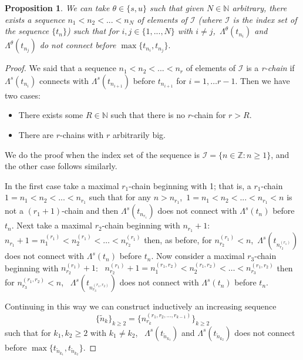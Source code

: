 \documentclass[12pt]{amsart}
\theoremstyle{plain} %
\newtheorem{proposition}[theorem]{Proposition}
\theoremstyle{definition} %
\numberwithin{equation}{section}
\begin{document}
  \begin{proposition}\label{cadeias}
  We can take $\theta \in \{s,u\}$ such that given $N\in \mathbb{N}$ arbitrary, there exists a sequence $n_1<n_2<...<n_N$ of elements of $\mathcal{I}$ (where $\mathcal{I}$ is the index set of the sequence $\{ t_n\}$) such that for $i,j\in  \{1,...,N \}$ with $i\neq j$,\ $\Lambda^{\theta}(t_{n_i})$ and $\Lambda^{\theta}(t_{n_j})$ do not connect before $\max \{ t_{n_i}, t_{n_j} \}.$
  \end{proposition}
 
 \begin{proof}
 
 We said that a sequence $n_1< n_2 <... <n_r$ of elements of $\mathcal{I}$ is a \emph{r-chain} if  $\Lambda^s(t_{n_i})$ connects with $\Lambda^s(t_{n_{i+1}})$ before $t_{n_{i+1}}$ for $i=1,\dots r-1$. Then we have two cases:
 \begin{itemize}
    \item There exists some $R\in \mathbb{N}$ such that there is no $r$-chain for $r>R$.
    \item There are $r$-chains with $r$ arbitrarily big.
    \end{itemize}

 We do the proof when the index set of the sequence is $\mathcal{I}=\{n\in \mathbb{Z}:n\geq 1\}$, and the other case follows similarly.  
 
 In the first case take a maximal $r_1$-chain beginning with 1; that is, a $r_1$-chain  $1=n_1<n_2<...<n_{r_1}$ such that for any $n>n_{r_1}$,\ $1=n_1<n_2<...<n_{r_1}<n$ is not a $(r_1+1)$-chain and then $\Lambda^s(t_{n_{r_1}})$ does not connect with $\Lambda^s(t_{n})$ before $t_n$.
 Next take a maximal $r_2$-chain beginning with $n_{r_1}+1$:\ $n_{r_1}+1=n^{(r_1)}_1<n^{(r_1)}_2<\dots < n^{(r_1)}_{r_2}$ then, as before, for $n^{(r_1)}_{r_2}< n$,\ $\Lambda^s(t_{n^{(r_1)}_{r_2}})$ does not connect with $\Lambda^s(t_{n})$ before $t_n$. Now 
 consider a maximal $r_3$-chain beginning with $n^{(r_1)}_{r_2}+1$: \ $n^{(r_1)}_{r_2}+1=n^{(r_1,r_2)}_1<n^{(r_1,r_2)}_2<\dots < n^{(r_1,r_2)}_{r_3}$ then for $n^{(r_1,r_2)}_{r_3}< n$, \ $\Lambda^s(t_{n^{(r_1,r_2)}_{r_3}})$ does not connect with $\Lambda^s(t_{n})$ before $t_n$. 
 
 Continuing in this way we can construct inductively an increasing sequence 
 $$\{ \tilde{n}_k \}_{k\geq 2}= \{ n_{r_k}^{(r_1,r_2,\dots,r_{k-1})} \}_{k\geq 2}$$  
 such that for $k_1, k_2 \geq 2$ with $k_1\neq k_2$, \ $\Lambda^{s}(t_{\tilde{n}_{k_1}})$ and $\Lambda^{s}(t_{\tilde{n}_{k_2}})$ does not connect before $\max \{ t_{\tilde{n}_{k_1}}, t_{\tilde{n}_{k_2}} \}$.
 

\end{proof}
\end{document}
